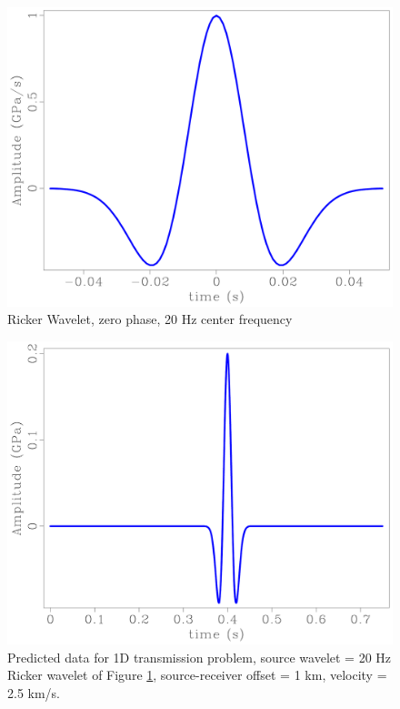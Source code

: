 \begin{figure}[ht]   
\begin{center}
\includegraphics[width=\textwidth]{wavelet.pdf}
\caption{Ricker Wavelet, zero phase, 20 Hz center frequency}
\label{fig:wavelet}
\end{center}
\end{figure}

\begin{figure}[ht]   
\begin{center}
\includegraphics[width=\textwidth]{data.pdf}
\caption{Predicted data for 1D transmission 
  problem, source wavelet = 20 Hz Ricker wavelet of Figure 
  \ref{fig:wavelet}, source-receiver offset = 1 km, velocity = 2.5 
  km/s.}
\label{fig:data}
\end{center}
\end{figure}

